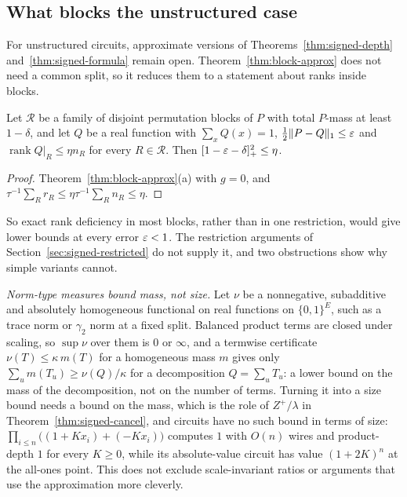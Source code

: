 \subsection{What blocks the unstructured case}\label{sec:signed-barriers}

For unstructured circuits, approximate versions of Theorems~\ref{thm:signed-depth} and~\ref{thm:signed-formula} remain open. Theorem~\ref{thm:block-approx} does not need a common split, so it reduces them to a statement about ranks inside blocks.

\begin{proposition}[transfer]\label{prop:transfer}
Let $\mathcal R$ be a family of disjoint permutation blocks of $P$ with total $P$-mass at least $1-\delta$, and let $Q$ be a real function with $\sum_xQ(x)=1$, $\frac12\lVert P-Q\rVert_1\le\varepsilon$ and $\operatorname{rank}Q|_R\le\eta n_R$ for every $R\in\mathcal R$. Then $[1-\varepsilon-\delta]_+^2\le\eta$.
\end{proposition}

\begin{proof}
Theorem~\ref{thm:block-approx}(a) with $g=0$, and $\tau^{-1}\sum_Rr_R\le\eta\tau^{-1}\sum_Rn_R\le\eta$.
\end{proof}

So exact rank deficiency in most blocks, rather than in one restriction, would give lower bounds at every error $\varepsilon<1$. The restriction arguments of Section~\ref{sec:signed-restricted} do not supply it, and two obstructions show why simple variants cannot.

\emph{Norm-type measures bound mass, not size.} Let $\nu$ be a nonnegative, subadditive and absolutely homogeneous functional on real functions on $\{0,1\}^E$, such as a trace norm or $\gamma_2$ norm at a fixed split. Balanced product terms are closed under scaling, so $\sup\nu$ over them is $0$ or $\infty$, and a termwise certificate $\nu(T)\le\kappa\,m(T)$ for a homogeneous mass $m$ gives only $\sum_um(T_u)\ge\nu(Q)/\kappa$ for a decomposition $Q=\sum_uT_u$: a lower bound on the mass of the decomposition, not on the number of terms. Turning it into a size bound needs a bound on the mass, which is the role of $Z^+/\lambda$ in Theorem~\ref{thm:signed-cancel}, and circuits have no such bound in terms of size: $\prod_{i\le n}\bigl((1+Kx_i)+(-Kx_i)\bigr)$ computes $1$ with $O(n)$ wires and product-depth $1$ for every $K\ge0$, while its absolute-value circuit has value $(1+2K)^n$ at the all-ones point. This does not exclude scale-invariant ratios or arguments that use the approximation more cleverly.

